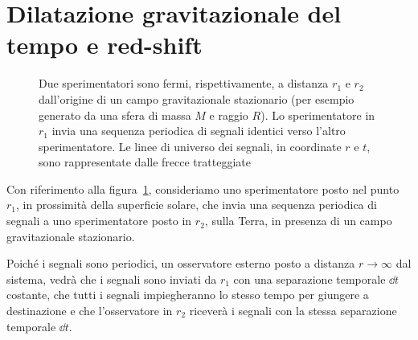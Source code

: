 \section{Dilatazione gravitazionale del tempo e red-shift}
\label{sec:red-shift-gravitazionale}

\begin{figure}
  \centering
  \caption[Dilatazione gravitazionale dei tempi e redshift]{Due sperimentatori
    sono fermi, rispettivamente, a distanza $r_{1}$ e $r_{2}$ dall'origine di un
    campo gravitazionale stazionario (per esempio generato da una sfera di massa
    $M$ e raggio $R$).  Lo sperimentatore in $r_{1}$ invia una sequenza
    periodica di segnali identici verso l'altro sperimentatore.  Le linee di
    universo dei segnali, in coordinate $r$ e $t$, sono rappresentate dalle
    frecce tratteggiate}
  \label{fig:redshift}
\end{figure}
Con riferimento alla figura~\ref{fig:redshift}, consideriamo uno sperimentatore
posto nel punto $r_{1}$, in prossimità della superficie solare, che invia una
sequenza periodica di segnali a uno sperimentatore posto in $r_{2}$, sulla
Terra, in presenza di un campo gravitazionale stazionario.

Poiché i segnali sono periodici, un osservatore esterno posto a distanza $r \to
\infty$ dal sistema, vedrà che i segnali sono inviati da $r_{1}$ con una
separazione temporale $\dd t$ costante, che tutti i segnali impiegheranno lo
stesso tempo per giungere a destinazione e che l'osservatore in $r_2$ riceverà i
segnali con la stessa separazione temporale $\dd t$.

